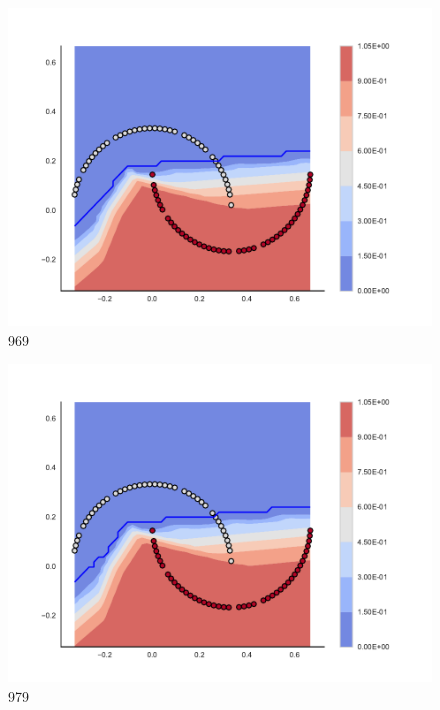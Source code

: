 \begin{subfigure}[b]{0.09\textwidth}
    \includegraphics[clip, trim=2.35cm 1.75cm 4.5cm 0cm,width=\textwidth]{img/convergence/969.pdf}
    \caption{969}
    \label{fig:convergence_969}
\end{subfigure}
%
\begin{subfigure}[b]{0.09\textwidth}
    \includegraphics[clip, trim=2.35cm 1.75cm 4.5cm 0cm,width=\textwidth]{img/convergence/979.pdf}
    \caption{979}
    \label{fig:convergence_979}
\end{subfigure}
%
